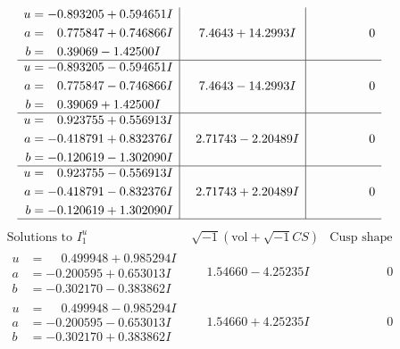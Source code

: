 \documentclass[1p]{elsarticle_modified}
\theoremstyle{definition}
\newcommand{\I}{\sqrt{-1}}
\begin{document}
$$\begin{array}{c|c|c}
\begin{aligned}
u &= -0.893205 + 0.594651 I \\
a &= \phantom{-}0.775847 + 0.746866 I \\
b &= \phantom{-}0.39069 - 1.42500 I\end{aligned}
 & \phantom{-}7.4643 + 14.2993 I & \phantom{-0.000000 } 0 \\ \hline\begin{aligned}
u &= -0.893205 - 0.594651 I \\
a &= \phantom{-}0.775847 - 0.746866 I \\
b &= \phantom{-}0.39069 + 1.42500 I\end{aligned}
 & \phantom{-}7.4643 - 14.2993 I & \phantom{-0.000000 } 0 \\ \hline\begin{aligned}
u &= \phantom{-}0.923755 + 0.556913 I \\
a &= -0.418791 + 0.832376 I \\
b &= -0.120619 - 1.302090 I\end{aligned}
 & \phantom{-}2.71743 - 2.20489 I & \phantom{-0.000000 } 0 \\ \hline\begin{aligned}
u &= \phantom{-}0.923755 - 0.556913 I \\
a &= -0.418791 - 0.832376 I \\
b &= -0.120619 + 1.302090 I\end{aligned}
 & \phantom{-}2.71743 + 2.20489 I & \phantom{-0.000000 } 0\\
 \hline 
 \end{array}$$\newpage$$\begin{array}{c|c|c}  
\text{Solutions to }I^u_{1}& \I (\text{vol} + \sqrt{-1}CS) & \text{Cusp shape}\\
 \hline 
\begin{aligned}
u &= \phantom{-}0.499948 + 0.985294 I \\
a &= -0.200595 + 0.653013 I \\
b &= -0.302170 - 0.383862 I\end{aligned}
 & \phantom{-}1.54660 - 4.25235 I & \phantom{-0.000000 } 0 \\ \hline\begin{aligned}
u &= \phantom{-}0.499948 - 0.985294 I \\
a &= -0.200595 - 0.653013 I \\
b &= -0.302170 + 0.383862 I\end{aligned}
 & \phantom{-}1.54660 + 4.25235 I & \phantom{-0.000000 } 0 \\ \hline\begin{aligned}

\end{aligned}
\end{array}$$
\end{document}
